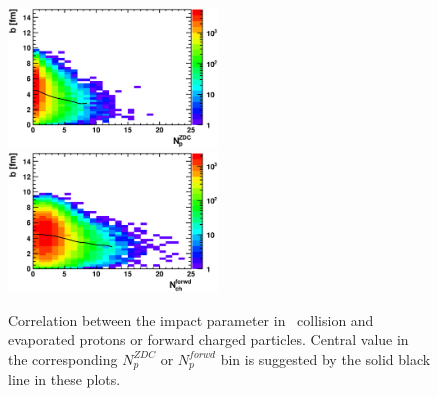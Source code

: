 \begin{figure} 
\begin{center} 
\includegraphics[width=0.495\textwidth]{plots/chpt7/tau9_bimpact_vs_accept_proton.eps}
\includegraphics[width=0.495\textwidth]{plots/chpt7/tau9_bimpact_vs_accept_forward_charged.eps}
\caption[Correlation between the impact parameter in \eA\ collisions and the number of evaporated protons or forward charged particles]
{Correlation between the impact parameter in \eA\ collision and evaporated protons or forward charged particles. Central value in the corresponding $N^{ZDC}_{p}$ or $N^{forwd}_{p}$ bin is suggested by the solid black line in these plots.
}
\label{fig:bimp_corre_p_forCh}
\end{center} 
\end{figure}

